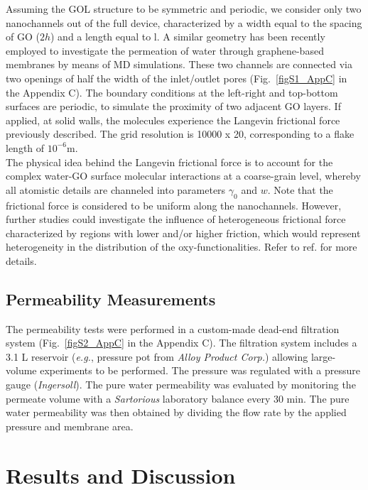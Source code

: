Assuming the GOL structure to be symmetric and periodic,\cite{han2013ultrathin} we consider only two nanochannels out of the full device, characterized by a width equal to the spacing of GO ($2h$) and a length equal to l. A similar geometry has been recently employed to investigate the permeation of water through graphene-based membranes by means of MD simulations.\cite{muscatello2016optimizing} These two channels are connected via two openings of half the width of the inlet/outlet pores (Fig.~\ref{figS1_AppC} in the Appendix C). The boundary conditions at the left-right and top-bottom surfaces are periodic, to simulate the proximity of two adjacent GO layers. If applied, at solid walls, the molecules experience the Langevin frictional force previously described. The grid resolution is 10000 x 20, corresponding to a flake length of $10^{-6}$m.\\
The physical idea behind the Langevin frictional force is to account for the complex water-GO surface molecular interactions at a coarse-grain level, whereby all atomistic details are channeled into parameters  $\gamma_0$ and $w$. Note that the frictional force is considered to be uniform along the nanochannels. However, further studies could investigate the influence of heterogeneous frictional force characterized by regions with lower and/or higher friction, which would represent heterogeneity in the distribution of the oxy-functionalities. Refer to ref.\cite{montessori2017extended} for more details.
\subsection{Permeability Measurements}
The permeability tests were performed in a custom-made dead-end filtration system (Fig.~\ref{figS2_AppC} in the Appendix C). The filtration system includes a 3.1 L reservoir (\textit{e.g.}, pressure pot from \textit{Alloy Product Corp.}) allowing large-volume experiments to be performed. The pressure was regulated with a pressure gauge (\textit{Ingersoll}). The pure water permeability was evaluated by monitoring the permeate volume with a \textit{Sartorious} laboratory balance every 30 min. The pure water permeability was then obtained by dividing the flow rate by the applied pressure and membrane area.
\section{Results and Discussion}
